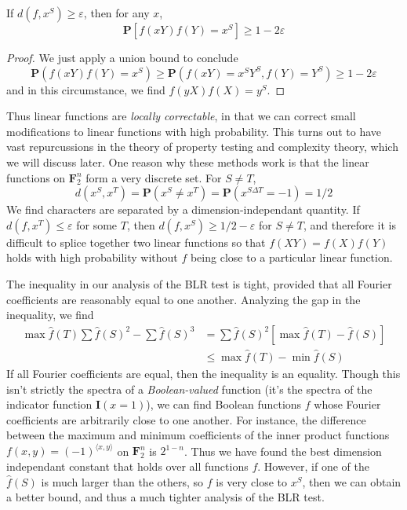 \begin{theorem}
    If $d(f,x^S) \geq \varepsilon$, then for any $x$,
    \[ \mathbf{P}[f(xY)f(Y) = x^S] \geq 1 - 2 \varepsilon \]
\end{theorem}
\begin{proof}
    We just apply a union bound to conclude
    \[ \mathbf{P}(f(xY)f(Y) = x^S) \geq \mathbf{P}(f(xY) = x^SY^S, f(Y) = Y^S) \geq 1 - 2\varepsilon \]
    and in this circumstance, we find $f(yX)f(X) = y^S$.
\end{proof}

Thus linear functions are {\it locally correctable}, in that we can correct small modifications to linear functions with high probability. This turns out to have vast repurcussions in the theory of property testing and complexity theory, which we will discuss later. One reason why these methods work is that the linear functions on $\mathbf{F}_2^n$ form a very discrete set. For $S \neq T$,
%
\[ d(x^S,x^T) = \mathbf{P}(x^S \neq x^T) = \mathbf{P}(x^{S \Delta T} = -1) = 1/2 \]
%
We find characters are separated by a dimension-independant quantity. If $d(f,x^T) \leq \varepsilon$ for some $T$, then $d(f,x^S) \geq 1/2 - \varepsilon$ for $S \neq T$, and therefore it is difficult to splice together two linear functions so that $f(XY) = f(X)f(Y)$ holds with high probability without $f$ being close to a particular linear function.

The inequality in our analysis of the BLR test is tight, provided that all Fourier coefficients are reasonably equal to one another. Analyzing the gap in the inequality, we find
%
\begin{align*}
    \max \widehat{f}(T) \sum \widehat{f}(S)^2 - \sum \widehat{f}(S)^3 &= \sum \widehat{f}(S)^2 [\max \widehat{f}(T) - \widehat{f}(S)]\\
    &\leq \max \widehat{f}(T) - \min \widehat{f}(S)
\end{align*}
%
If all Fourier coefficients are equal, then the inequality is an equality. Though this isn't strictly the spectra of a {\it Boolean-valued} function (it's the spectra of the indicator function $\mathbf{I}(x = 1)$), we can find Boolean functions $f$ whose Fourier coefficients are arbitrarily close to one another. For instance, the difference between the maximum and minimum coefficients of the inner product functions $f(x,y) = (-1)^{\langle x, y \rangle}$ on $\mathbf{F}_2^n$ is $2^{1-n}$. Thus we have found the best dimension independant constant that holds over all functions $f$. However, if one of the $\widehat{f}(S)$ is much larger than the others, so $f$ is very close to $x^S$, then we can obtain a better bound, and thus a much tighter analysis of the BLR test.

